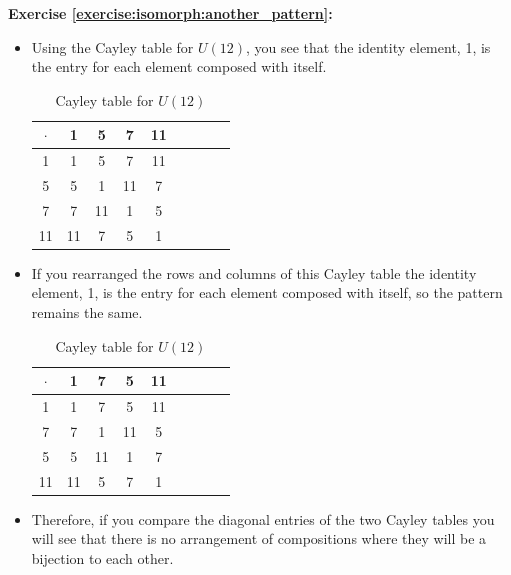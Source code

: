 \noindent\textbf{Exercise \ref{exercise:isomorph:another_pattern}:}
\begin{itemize}
\item
Using the Cayley table for $U(12)$, you see that the identity element, 1, is the entry for each element composed with itself.
\begin{table}[H]
\caption{Cayley table for $U(12)$}
{\small
\begin{center}
\begin{tabular}{c|cccccccc}
$\cdot$ & 1 & 5 & 7 & 11  \\
\hline
1        & 1 & 5 & 7 & 11  \\
5       & 5 & 1 & 11 & 7 \\
7       & 7 & 11 & 1 & 5  \\
11      & 11 & 7 & 5 & 1 \\
\end{tabular}
\end{center}
}
\end{table}

\item
If you rearranged the rows and columns of this Cayley table the identity element, 1, is the entry for each element composed with itself, so the pattern remains the same.
\begin{table}[H]
\caption{Cayley table for $U(12)$}
{\small
\begin{center}
\begin{tabular}{c|cccccccc}
$\cdot$ & 1 & 7 & 5 & 11  \\
\hline
1        & 1 & 7 & 5 & 11  \\
7       & 7 & 1 & 11 & 5 \\
5      & 5 & 11 & 1 & 7  \\
11      & 11 & 5 & 7 & 1 \\
\end{tabular}
\end{center}
}
\end{table}

\item
Therefore, if you compare the diagonal entries of the two Cayley tables you will see that there is no arrangement of compositions where they will be a bijection to each other.
\end{itemize}

